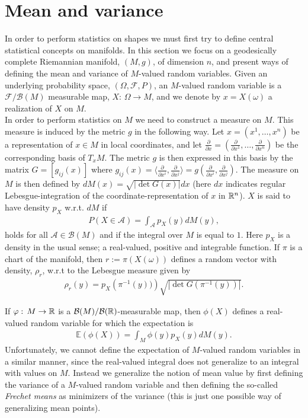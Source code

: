 \section{Mean and variance}
\label{sec:mean_and_variance}

In order to perform statistics on shapes we must first try to define central statistical concepts on manifolds. In this section we focus on a geodesically complete Riemannian manifold, $(M, g)$, of dimension $n$, and present ways of defining the mean and variance of $M$-valued random variables. Given an underlying probability space, $(\Omega, \mathcal{F}, P)$, an $M$-valued random variable is a $\mathcal{F}/\mathcal{B}(M)$ measurable map, $X: \, \Omega \rightarrow M$, and we denote by $x = X(\omega)$ a realization of $X$ on $M$.\\[0.2 cm]
In order to perform statistics on $M$ we need to construct a measure on $M$. This measure is induced by the metric $g$ in the following way. Let $x = (x^1, \ldots , x^n)$ be a representation of $x \in M$ in local coordinates, and let $\frac{\partial}{\partial x} = (\frac{\partial}{\partial x^1}, \ldots , \frac{\partial}{\partial x^n})$ be the corresponding basis of $T_x M$. The metric $g$ is then expressed in this basis by the matrix $G = [g_{ij}(x)]$ where $g_{ij}(x) = \langle \frac{\partial}{\partial x^i} , \frac{\partial}{\partial x^j} \rangle = g\left(\frac{\partial}{\partial x^i}, \frac{\partial}{\partial x^j}\right)$. The measure on $M$ is then defined by $d M(x) = \sqrt{\left| \det G(x) \right|} dx$ (here $dx$ indicates regular Lebesgue-integration of the coordinate-representation of $x$ in $\mathbb{R}^n$). $X$ is said to have density $p_X$ w.r.t. $d M$ if
\begin{align*}
P(X \in \mathcal{A}) = \int_{\mathcal{A}} p_X(y) d M(y),
\end{align*}
holds for all $\mathcal{A} \in \mathcal{B}(M)$ and if the integral over $M$ is equal to $1$. Here
$p_X$ is a density in the usual sense; a real-valued, positive and integrable function. If $\pi$ is a chart of the manifold, then $r := \pi(X(\omega))$ defines a random vector with density, $\rho_r$, w.r.t to the Lebesgue measure given by
\begin{align*}
\rho_r (y) = p_X \left(\pi^{-1}(y))\right) \sqrt{\left| \det G\left(\pi^{-1}(y)\right) \right|}.
\end{align*}

If $\varphi: \, M \rightarrow \mathbb{R}$ is a $\mathcal{B}(M)/ \mathcal{B}(\mathbb{R})$-measurable map, then $\phi(X)$ defines a real-valued random variable for which the expectation is
\begin{align*}
\mathbb{E} (\phi(X)) = \int_M \phi(y) p_X(y) d M(y).
\end{align*}
Unfortunately, we cannot define the expectation of $M$-valued random variables in a similar manner, since the real-valued integral does not generalize to an integral with values on $M$. Instead we generalize the notion of mean value by first defining the variance of a $M$-valued random variable and then defining the so-called \textit{Frechet means} as minimizers of the variance (this is just one possible way of generalizing mean points).


